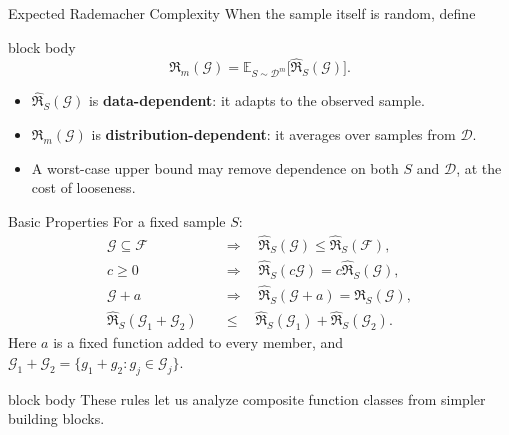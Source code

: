 \documentclass[aspectratio=169,10pt]{beamer}
\newcommand{\D}{\mathcal{D}}
\newcommand{\Gc}{\mathcal{G}}
\newcommand{\Fc}{\mathcal{F}}
\newcommand{\Rad}{\mathfrak{R}}
\newcommand{\RadS}{\widehat{\mathfrak{R}}_S}
\newcommand{\E}{\mathbb{E}}
\newcommand{\KeyBox}[1]{%
  \begin{beamercolorbox}[rounded=true,sep=0.22cm,wd=\linewidth]{block body}
    #1
  \end{beamercolorbox}%
}
\begin{document}
\begin{frame}[t]{Expected Rademacher Complexity}
  \vspace{0.10cm}
  When the sample itself is random, define
  \begin{beamercolorbox}[rounded=true,sep=0.22cm,wd=\linewidth]{block body}
    \[
      \boxed{
      \Rad_m(\Gc)=\E_{S\sim\D^m}\bigl[\RadS(\Gc)\bigr].}
    \]
  \end{beamercolorbox}
  \vspace{0.18cm}
  \begin{itemize}
    \setlength{\itemsep}{0.15cm}
    \item $\RadS(\Gc)$ is \textbf{data-dependent}: it adapts to the observed sample.
    \item $\Rad_m(\Gc)$ is \textbf{distribution-dependent}: it averages over samples from $\D$.
    \item A worst-case upper bound may remove dependence on both $S$ and $\D$, at the cost of looseness.
  \end{itemize}
\end{frame}

\begin{frame}[t]{Basic Properties}
  \vspace{0.01cm}
  For a fixed sample $S$:
  \begin{align*}
    \Gc\subseteq\Fc
      &\quad\Longrightarrow\quad \RadS(\Gc)\le \RadS(\Fc),\\[0.08cm]
    c\ge 0
      &\quad\Longrightarrow\quad \RadS(c\Gc)=c\RadS(\Gc),\\[0.08cm]
    \Gc+a
      &\quad\Longrightarrow\quad \RadS(\Gc+a)=\RadS(\Gc),\\[0.08cm]
    \RadS(\Gc_1+\Gc_2)
      &\quad\le\quad \RadS(\Gc_1)+\RadS(\Gc_2).
  \end{align*}
  Here $a$ is a fixed function added to every member, and
  $\Gc_1+\Gc_2=\{g_1+g_2:g_j\in\Gc_j\}$.
  \vspace{0.10cm}
  \KeyBox{These rules let us analyze composite function classes from simpler building blocks.}
\end{frame}
\end{document}
